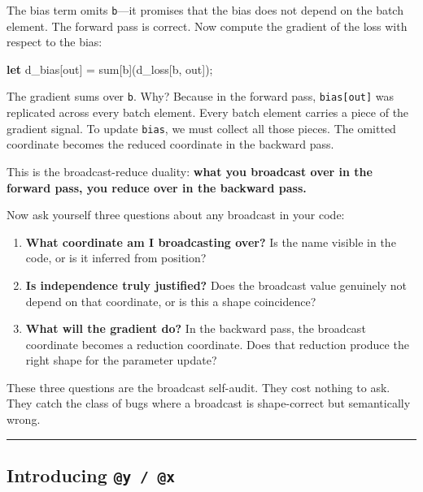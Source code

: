 \documentclass[11pt,]{article}
\newenvironment{Shaded}{}{}
\newcommand{\KeywordTok}[1]{\textcolor[rgb]{0.00,0.44,0.13}{\textbf{#1}}}
\newcommand{\NormalTok}[1]{#1}
\newcommand{\OperatorTok}[1]{\textcolor[rgb]{0.40,0.40,0.40}{#1}}
\providecommand{\tightlist}{%
  \setlength{\itemsep}{0pt}\setlength{\parskip}{0pt}}
\begin{document}
The bias term omits \texttt{b}---it promises that the bias does not
depend on the batch element. The forward pass is correct. Now compute
the gradient of the loss with respect to the bias:

\begin{Shaded}
\begin{Highlighting}[]
\KeywordTok{let}\NormalTok{ d_bias}\OperatorTok{[}\NormalTok{out}\OperatorTok{]}\NormalTok{ = sum}\OperatorTok{[}\NormalTok{b}\OperatorTok{]}\NormalTok{(d_loss}\OperatorTok{[}\NormalTok{b, out}\OperatorTok{]}\NormalTok{);}
\end{Highlighting}
\end{Shaded}

The gradient sums over \texttt{b}. Why? Because in the forward pass,
\texttt{bias{[}out{]}} was replicated across every batch element. Every
batch element carries a piece of the gradient signal. To update
\texttt{bias}, we must collect all those pieces. The omitted coordinate
becomes the reduced coordinate in the backward pass.

This is the broadcast-reduce duality: \textbf{what you broadcast over in
the forward pass, you reduce over in the backward pass.}

Now ask yourself three questions about any broadcast in your code:

\begin{enumerate}
\def\labelenumi{\arabic{enumi}.}
\tightlist
\item
  \textbf{What coordinate am I broadcasting over?} Is the name visible
  in the code, or is it inferred from position?
\item
  \textbf{Is independence truly justified?} Does the broadcast value
  genuinely not depend on that coordinate, or is this a shape
  coincidence?
\item
  \textbf{What will the gradient do?} In the backward pass, the
  broadcast coordinate becomes a reduction coordinate. Does that
  reduction produce the right shape for the parameter update?
\end{enumerate}

These three questions are the broadcast self-audit. They cost nothing to
ask. They catch the class of bugs where a broadcast is shape-correct but
semantically wrong.

\begin{center}\rule{0.5\linewidth}{0.4pt}\end{center}

\hypertarget{introducing-y-x}{%
\subsection{\texorpdfstring{Introducing
\texttt{@y\ /\ @x}}{Introducing @y / @x}}\label{introducing-y-x}}
\end{document}
